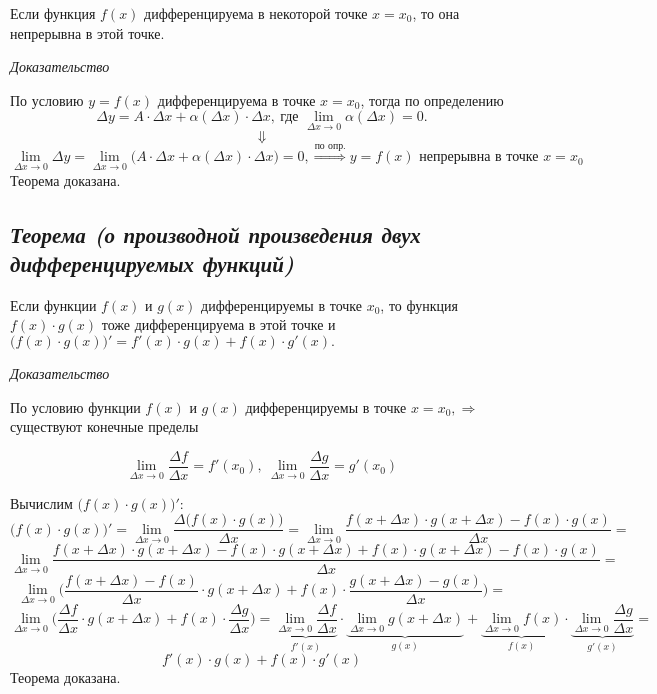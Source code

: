 Если функция $f(x)$ дифференцируема в некоторой точке $x = x_0$, то она непрерывна в этой точке.

\textit{Доказательство}

По условию $y = f(x)$ дифференцируема в точке $x = x_0$, тогда по определению $$\Delta y = A \cdot \Delta x + \alpha(\Delta x)\cdot \Delta x, \ \text{где } \lim\limits_{\Delta x \rightarrow 0}\alpha(\Delta x) = 0. $$ $$\Downarrow $$ $$\lim\limits_{\Delta x \rightarrow 0}\Delta y = \lim\limits_{\Delta x \rightarrow 0}\big(A \cdot \Delta x + \alpha(\Delta x)\cdot \Delta x
\big) = 0, \overset{\text{по опр.}}{\Rightarrow} y = f(x) \text{ непрерывна в точке } x = x_0$$ Теорема доказана.
\newpage 
\subsection{\textit{Теорема (о производной произведения двух дифференцируемых функций)}}

Если функции $f(x)$ и $g(x)$ дифференцируемы в точке $x_0$, то функция $f(x)\cdot g(x)$ тоже дифференцируема в этой точке и $\big(f(x)\cdot g(x)\big)' = f'(x)\cdot g(x) + f(x)\cdot g'(x).$

\textit{Доказательство}

По условию функции $f(x)$ и $g(x)$ дифференцируемы в точке $x = x_0, \Rightarrow$ существуют конечные пределы

$$\lim\limits_{\Delta x \rightarrow 0}\frac{\Delta f}{\Delta x} = f'(x_0), \ \lim\limits_{\Delta x \rightarrow 0}\frac{\Delta g}{\Delta x} = g'(x_0)$$

Вычислим $\big(f(x)\cdot g(x)\big)':$ $$\big(f(x)\cdot g(x)\big)' 
= \lim\limits_{\Delta x \rightarrow 0}{\frac{\Delta \big(f(x)\cdot g(x)\big)}{\Delta x}} 
= \lim\limits_{\Delta x \rightarrow 0}{\frac{f(x + \Delta x)\cdot g(x + \Delta x) - f(x)\cdot g(x)}{\Delta x}} 
= $$ $$\lim\limits_{\Delta x \rightarrow 0}{\frac{f(x + \Delta x)\cdot g(x + \Delta x) - f(x)\cdot g(x + \Delta x) + f(x)\cdot g(x + \Delta x) - f(x)\cdot g(x)}{\Delta x}} 
=$$ $$ \lim\limits_{\Delta x \rightarrow 0}\bigg(\frac{f(x + \Delta x)- f(x)}{\Delta x}\cdot g(x + \Delta x) + f(x)\cdot \frac{g(x + \Delta x)- g(x)}{\Delta x}\bigg) 
=$$ $$ \lim\limits_{\Delta x \rightarrow 0}\bigg(\frac{\Delta f}{\Delta x}\cdot g(x + \Delta x) + f(x)\cdot \frac{\Delta g}{\Delta x}\bigg)
=\underbrace{\lim\limits_{\Delta x \rightarrow 0}\frac{\Delta f}{\Delta x}}_{f'(x)}\cdot \underbrace{\lim\limits_{\Delta x \rightarrow 0}g(x + \Delta x)}_{g(x)} + \underbrace{\lim\limits_{\Delta x \rightarrow 0}f(x)}_{f(x)}\cdot \underbrace{\lim\limits_{\Delta x \rightarrow 0}\frac{\Delta g}{\Delta x}}_{g'(x)}
=$$ $$f'(x)\cdot g(x) + f(x)\cdot g'(x) $$ Теорема доказана.
\newpage 
